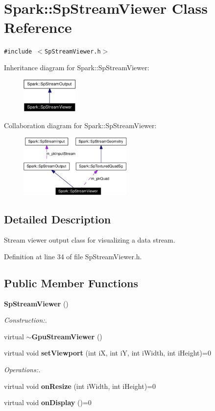 \section{Spark::Sp\-Stream\-Viewer Class Reference}
\label{classSpark_1_1SpStreamViewer}
{\tt \#include $<$Sp\-Stream\-Viewer.h$>$}

Inheritance diagram for Spark::Sp\-Stream\-Viewer:\begin{figure}[H]
\begin{center}
\leavevmode
\includegraphics[width=80pt]{classSpark_1_1SpStreamViewer__inherit__graph}
\end{center}
\end{figure}
Collaboration diagram for Spark::Sp\-Stream\-Viewer:\begin{figure}[H]
\begin{center}
\leavevmode
\includegraphics[width=158pt]{classSpark_1_1SpStreamViewer__coll__graph}
\end{center}
\end{figure}


\subsection{Detailed Description}
Stream viewer output class for visualizing a data stream. 

Definition at line 34 of file Sp\-Stream\-Viewer.h.\subsection*{Public Member Functions}
\begin{CompactItemize}
\item 
{\bf Sp\-Stream\-Viewer} ()
\begin{CompactList}\small\item\em Construction:. \item\end{CompactList}\item 
virtual {\bf $\sim$Gpu\-Stream\-Viewer} ()
\item 
virtual void {\bf set\-Viewport} (int i\-X, int i\-Y, int i\-Width, int i\-Height)=0
\begin{CompactList}\small\item\em Operations:. \item\end{CompactList}\item 
virtual void {\bf on\-Resize} (int i\-Width, int i\-Height)=0
\item 
virtual void {\bf on\-Display} ()=0
\end{CompactItemize}
